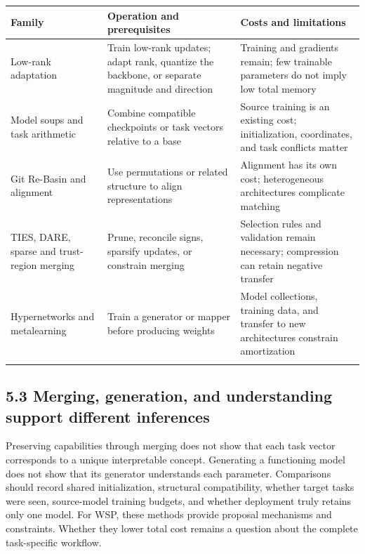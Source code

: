 \begingroup\small\setlength{\tabcolsep}{5pt}\renewcommand{\arraystretch}{1.18}

\begin{longtable}{>{\raggedright\arraybackslash}p{4.85cm}>{\raggedright\arraybackslash}p{4.85cm}>{\raggedright\arraybackslash}p{4.85cm}}

\toprule

\textbf{Family} & \textbf{Operation and prerequisites} & \textbf{Costs and limitations}\\\midrule\endhead

Low-rank adaptation \cite{r3,r13,r15,r23} & Train low-rank updates; adapt rank, quantize the backbone, or separate magnitude and direction & Training and gradients remain; few trainable parameters do not imply low total memory\\\addlinespace[3pt]

Model soups and task arithmetic \cite{r7,r10} & Combine compatible checkpoints or task vectors relative to a base & Source training is an existing cost; initialization, coordinates, and task conflicts matter\\\addlinespace[3pt]

Git Re-Basin and alignment \cite{r8,r18} & Use permutations or related structure to align representations & Alignment has its own cost; heterogeneous architectures complicate matching\\\addlinespace[3pt]

TIES, DARE, sparse and trust-region merging \cite{r17,r20,r31,r35} & Prune, reconcile signs, sparsify updates, or constrain merging & Selection rules and validation remain necessary; compression can retain negative transfer\\\addlinespace[3pt]

Hypernetworks and metalearning \cite{r2,r14,r44,r46} & Train a generator or mapper before producing weights & Model collections, training data, and transfer to new architectures constrain amortization\\\addlinespace[3pt]

\bottomrule\end{longtable}\endgroup

\subsection*{5.3 Merging, generation, and understanding support different inferences}

Preserving capabilities through merging does not show that each task vector corresponds to a unique interpretable concept. Generating a functioning model does not show that its generator understands each parameter. Comparisons should record shared initialization, structural compatibility, whether target tasks were seen, source-model training budgets, and whether deployment truly retains only one model.\cite{r7,r8,r10,r17,r20,r43} For WSP, these methods provide proposal mechanisms and constraints. Whether they lower total cost remains a question about the complete task-specific workflow.


